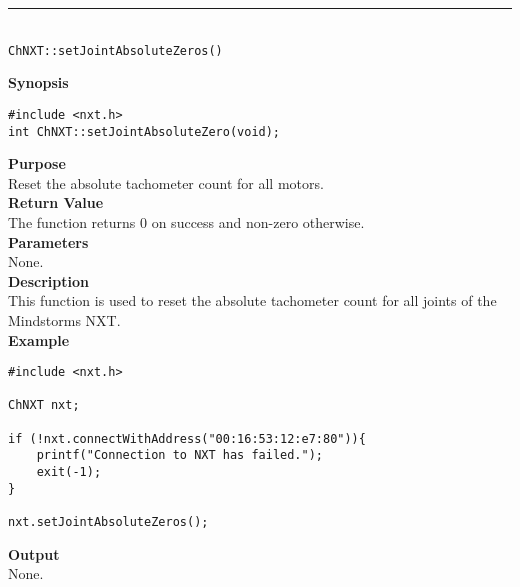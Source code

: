 \noindent
\vspace{5pt}
\rule{4.5in}{0.015in}\\
\noindent
{\LARGE \texttt{ChNXT::setJointAbsoluteZeros()} }\\


\noindent
{\bf Synopsis}
\begin{lstlisting}
#include <nxt.h>
int ChNXT::setJointAbsoluteZero(void);
\end{lstlisting}

\noindent
{\bf Purpose}\\
Reset the absolute tachometer count for all motors.\\

\noindent
{\bf Return Value}\\
The function returns 0 on success and non-zero otherwise.\\

\noindent
{\bf Parameters}\\
None.\\

\noindent
{\bf Description}\\
This function is used to reset the absolute tachometer count for 
all joints of the Mindstorms NXT.\\

\noindent
{\bf Example}
\begin{lstlisting}
#include <nxt.h> 

ChNXT nxt;

if (!nxt.connectWithAddress("00:16:53:12:e7:80")){
    printf("Connection to NXT has failed.");
    exit(-1);
}
    
nxt.setJointAbsoluteZeros();
\end{lstlisting}

\noindent
{\bf Output}\\
None.\\
\\
